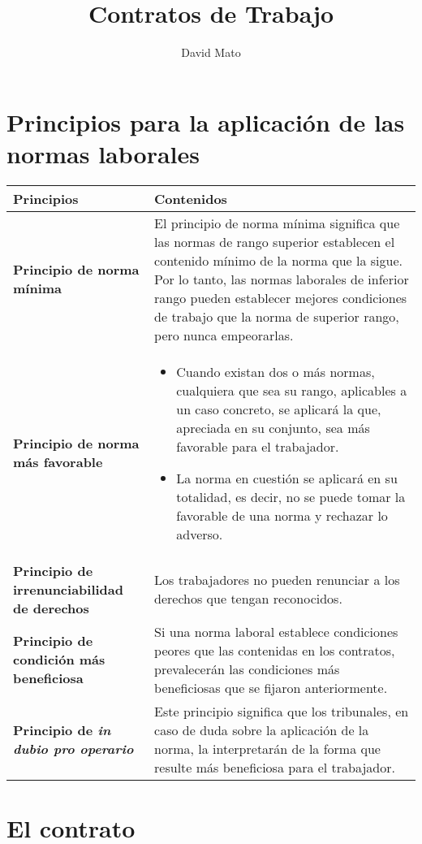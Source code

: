 \documentclass{article}
\title{Contratos de Trabajo}
\author{David Mato}
\date{} %
\begin{document}
	
	\maketitle %
	
	\section*{Principios para la aplicación de las normas laborales}
	
	\begin{longtable}{|p{}|p{}|}
		\hline
		\textbf{Principios} & \textbf{Contenidos} \\
		\hline
		\endhead
		\textbf{Principio de norma mínima} & El principio de norma mínima significa que las normas de rango superior establecen el contenido mínimo de la norma que la sigue. Por lo tanto, las normas laborales de inferior rango pueden establecer mejores condiciones de trabajo que la norma de superior rango, pero nunca empeorarlas. \\
		\hline
		\textbf{Principio de norma más favorable} & 
		\begin{itemize}
			\item Cuando existan dos o más normas, cualquiera que sea su rango, aplicables a un caso concreto, se aplicará la que, apreciada en su conjunto, sea más favorable para el trabajador.
			\item La norma en cuestión se aplicará en su totalidad, es decir, no se puede tomar la favorable de una norma y rechazar lo adverso.
		\end{itemize} \\
		\hline
		\textbf{Principio de irrenunciabilidad de derechos} & Los trabajadores no pueden renunciar a los derechos que tengan reconocidos. \\
		\hline
		\textbf{Principio de condición más beneficiosa} & Si una norma laboral establece condiciones peores que las contenidas en los contratos, prevalecerán las condiciones más beneficiosas que se fijaron anteriormente. \\
		\hline
		\textbf{Principio de \textit{in dubio pro operario}} & Este principio significa que los tribunales, en caso de duda sobre la aplicación de la norma, la interpretarán de la forma que resulte más beneficiosa para el trabajador. \\
		\hline
	\end{longtable}
	
	\section*{El contrato}
	
\end{document}
